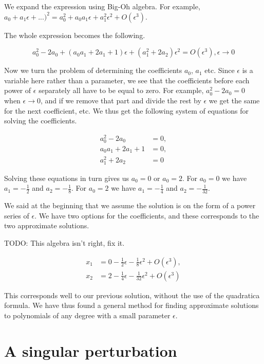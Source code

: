 \documentclass[12pt]{article}
\begin{document}
We expand the expression using Big-Oh algebra. For example, $a_0 + a_1 \epsilon
+ ...)^2 = a_0^2 + a_0 a_1 \epsilon + a_1^2 \epsilon^2 + O(\epsilon^3)$.

The whole expression becomes the following.

\begin{equation}
a_0^2 - 2 a_0 + (a_0 a_1 + 2 a_1 + 1)\epsilon + (a_1^2 + 2 a_2)\epsilon^2 =
O(\epsilon^3), \epsilon \to 0
\end{equation}

Now we turn the problem of determining the coefficients $a_0$, $a_1$ etc. Since
$\epsilon$ is a variable here rather than a parameter, we see that the
coefficients before each power of $\epsilon$ separately all have to be equal to
zero. For example, $a_0^2 - 2 a_0 = 0$ when $\epsilon \to 0$, and if we remove
that part and divide the rest by $\epsilon$ we get the same for the next
coefficient, etc. We thus get the following system of equations for solving the
coefficients.

\begin{align*}
a_0^2 - 2 a_0 &=0, \\
a_0 a_1 + 2 a_1 + 1 &= 0, \\
a_1^2 + 2 a_2 &= 0
\end{align*}

Solving these equations in turn gives us $a_0 = 0$ or $a_0 = 2$. For $a_0 = 0$ we
have $a_1 = - \frac{1}{2}$ and $a_2 = - \frac{1}{8}$. For $a_0 = 2$ we have $a_1 = -
\frac{1}{4}$ and $a_2 = - \frac{1}{32}$.

We said at the beginning that we assume the solution is on the form of a power
series of $\epsilon$. We have two options for the coefficients, and these
corresponds to the two approximate solutions.

TODO: This algebra isn't right, fix it.

\begin{align*}
x_1 &= 0 - \frac{1}{2} \epsilon - \frac{1}{8} \epsilon^2 + O(\epsilon^3), \\
x_2 &= 2 - \frac{1}{4} \epsilon - \frac{1}{32} \epsilon^2 + O(\epsilon^3)
\end{align*}

This corresponds well to our previous solution, without the use of the
quadratica formula. We have thus found a general method for finding approximate
solutions to polynomials of any degree with a small parameter $\epsilon$.

\section{A singular perturbation}
\end{document}
